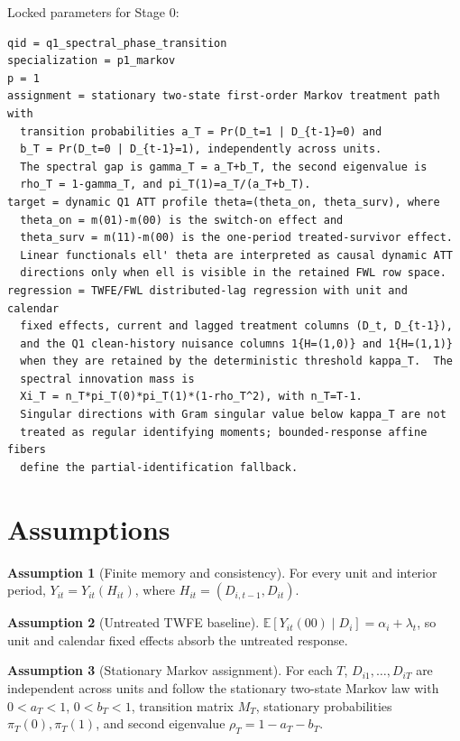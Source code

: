 \documentclass[11pt]{article}
\newcommand{\E}{\mathbb{E}}
\theoremstyle{definition}
\newtheorem{assumption}{Assumption}
\theoremstyle{plain}
\theoremstyle{remark}
\begin{document}
Locked parameters for Stage 0:
\begin{verbatim}
qid = q1_spectral_phase_transition
specialization = p1_markov
p = 1
assignment = stationary two-state first-order Markov treatment path with
  transition probabilities a_T = Pr(D_t=1 | D_{t-1}=0) and
  b_T = Pr(D_t=0 | D_{t-1}=1), independently across units.
  The spectral gap is gamma_T = a_T+b_T, the second eigenvalue is
  rho_T = 1-gamma_T, and pi_T(1)=a_T/(a_T+b_T).
target = dynamic Q1 ATT profile theta=(theta_on, theta_surv), where
  theta_on = m(01)-m(00) is the switch-on effect and
  theta_surv = m(11)-m(00) is the one-period treated-survivor effect.
  Linear functionals ell' theta are interpreted as causal dynamic ATT
  directions only when ell is visible in the retained FWL row space.
regression = TWFE/FWL distributed-lag regression with unit and calendar
  fixed effects, current and lagged treatment columns (D_t, D_{t-1}),
  and the Q1 clean-history nuisance columns 1{H=(1,0)} and 1{H=(1,1)}
  when they are retained by the deterministic threshold kappa_T.  The
  spectral innovation mass is
  Xi_T = n_T*pi_T(0)*pi_T(1)*(1-rho_T^2), with n_T=T-1.
  Singular directions with Gram singular value below kappa_T are not
  treated as regular identifying moments; bounded-response affine fibers
  define the partial-identification fallback.
\end{verbatim}

\section{Assumptions}
\begin{assumption}[Finite memory and consistency]\label{ass:finite-memory}
For every unit and interior period, \(Y_{it}=Y_{it}(H_{it})\), where \(H_{it}=(D_{i,t-1},D_{it})\).
\end{assumption}

\begin{assumption}[Untreated TWFE baseline]\label{ass:untreated-twfe}
\(\E[Y_{it}(00)\mid D_i]=\alpha_i+\lambda_t\), so unit and calendar fixed effects absorb the untreated response.
\end{assumption}

\begin{assumption}[Stationary Markov assignment]\label{ass:stationary-markov}
For each \(T\), \(D_{i1},\ldots,D_{iT}\) are independent across units and follow the stationary two-state Markov law with \(0<a_T<1\), \(0<b_T<1\), transition matrix \(M_T\), stationary probabilities \(\pi_T(0),\pi_T(1)\), and second eigenvalue \(\rho_T=1-a_T-b_T\).
\end{assumption}
\end{document}
